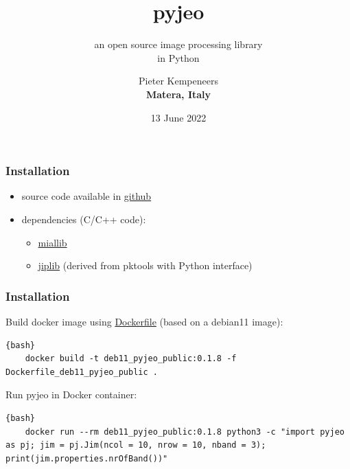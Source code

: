 \documentclass[11pt, handout, aspectratio=169]{beamer}
\title{pyjeo}
\subtitle{an open source image processing library \\
  in Python}
\author{Pieter Kempeneers\\
\textbf{Matera, Italy}}
\date{13 June 2022}
\begin{document}

\begin{frame}
	\maketitle	
\end{frame}


\begin{frame}[fragile]
  \frametitle{Installation}
  \begin{itemize}
  \item source code available in \href{https://github.com/ec-jrc/jeolib-pyjeo}{github}
  \item dependencies (C/C++ code):
    \begin{itemize}
    \item \href{https://github.com/ec-jrc/jeolib-miallib}{miallib}
    \item \href{https://github.com/ec-jrc/jeolib-jiplib}{jiplib} (derived from pktools with Python interface)
    \end{itemize}
  \end{itemize}
\end{frame}


\begin{frame}[fragile]
  \frametitle{Installation}
  

  Build docker image using \href{https://github.com/ec-jrc/jeolib-pyjeo/blob/master/docker/Dockerfile_deb10_pyjeo_public}{Dockerfile} (based on a debian11 image):

  \begin{lstlisting}{bash}
    docker build -t deb11_pyjeo_public:0.1.8 -f Dockerfile_deb11_pyjeo_public .
  \end{lstlisting}

  Run pyjeo in Docker container:

  \begin{lstlisting}{bash}
    docker run --rm deb11_pyjeo_public:0.1.8 python3 -c "import pyjeo as pj; jim = pj.Jim(ncol = 10, nrow = 10, nband = 3); print(jim.properties.nrOfBand())"   
  \end{lstlisting}
\end{frame}
\end{document}
